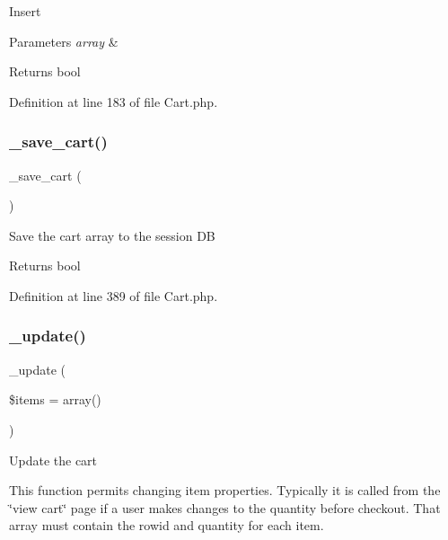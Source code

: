 Insert


\begin{DoxyParams}{Parameters}
{\em array} & \\
\hline
\end{DoxyParams}
\begin{DoxyReturn}{Returns}
bool 
\end{DoxyReturn}


Definition at line 183 of file Cart.\+php.

\mbox{\label{class_c_i___cart_abaa559f3e9e7f8ad933f19165fb61083}} 
\subsubsection{\texorpdfstring{\_save\_cart()}{\_save\_cart()}}
{\footnotesize\ttfamily \+\_\+save\+\_\+cart (\begin{DoxyParamCaption}{ }\end{DoxyParamCaption})\hspace{0.3cm}{\ttfamily [protected]}}

Save the cart array to the session DB

\begin{DoxyReturn}{Returns}
bool 
\end{DoxyReturn}


Definition at line 389 of file Cart.\+php.

\mbox{\label{class_c_i___cart_ac7b19afff2357d4b9e926ee2df1f3e65}} 
\subsubsection{\texorpdfstring{\_update()}{\_update()}}
{\footnotesize\ttfamily \+\_\+update (\begin{DoxyParamCaption}\item[{}]{\$items = {\ttfamily array()} }\end{DoxyParamCaption})\hspace{0.3cm}{\ttfamily [protected]}}

Update the cart

This function permits changing item properties. Typically it is called from the \char`\"{}view cart\char`\"{} page if a user makes changes to the quantity before checkout. That array must contain the rowid and quantity for each item.


